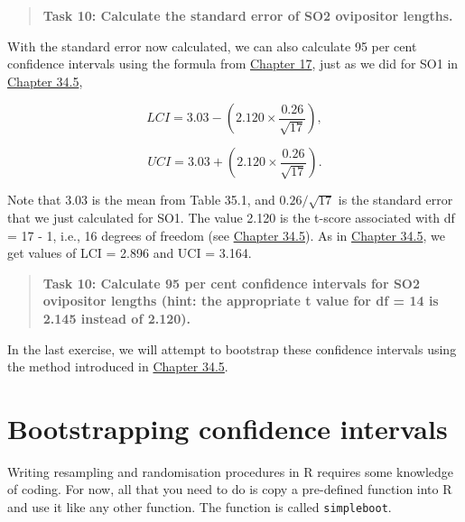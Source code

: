 \documentclass[
]{scrbook}
\begin{document}
\begin{quote}
\textbf{Task 10: Calculate the standard error of SO2 ovipositor lengths.}
\end{quote}

With the standard error now calculated, we can also calculate 95 per cent confidence intervals using the formula from \protect\hyperlink{Chapter_17}{Chapter 17}, just as we did for SO1 in \protect\hyperlink{bootstrapping}{Chapter 34.5},

\[LCI = 3.03 - \left(2.120 \times \frac{0.26}{\sqrt{17}}\right),\]

\[UCI = 3.03 + \left(2.120 \times \frac{0.26}{\sqrt{17}}\right).\]

Note that 3.03 is the mean from Table 35.1, and \(0.26/\sqrt{17}\) is the standard error that we just calculated for SO1.
The value 2.120 is the t-score associated with df = 17 - 1, i.e., 16 degrees of freedom (see \protect\hyperlink{bootstrapping}{Chapter 34.5}).
As in \protect\hyperlink{bootstrapping}{Chapter 34.5}, we get values of LCI = 2.896 and UCI = 3.164.

\begin{quote}
\textbf{Task 10: Calculate 95 per cent confidence intervals for SO2 ovipositor lengths (hint: the appropriate t value for df = 14 is 2.145 instead of 2.120).}
\end{quote}

In the last exercise, we will attempt to bootstrap these confidence intervals using the method introduced in \protect\hyperlink{bootstrapping}{Chapter 34.5}.

\hypertarget{bootstrapping-confidence-intervals}{%
\section{Bootstrapping confidence intervals}\label{bootstrapping-confidence-intervals}}

Writing resampling and randomisation procedures in R requires some knowledge of coding.
For now, all that you need to do is copy a pre-defined function into R and use it like any other function.
The function is called \texttt{simpleboot}.
\end{document}
